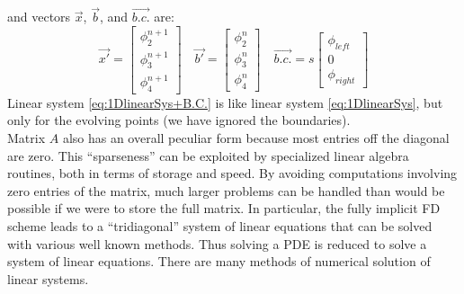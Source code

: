 and vectors $\vec{x}$, $\vec{b}$, and $\vec{b.c.}$ are:
\begin{equation}
\vec{x'}=\begin{bmatrix}
 \phi^{n+1}_{2} \\ \phi^{n+1}_{3} \\ \phi^{n+1}_{4}
\end{bmatrix}
\quad
\vec{b'}=\begin{bmatrix}
\phi^{n}_{2} \\ \phi^{n}_{3} \\ \phi^{n}_{4}
\end{bmatrix}
\quad
\vec{b.c.}=s \begin{bmatrix}
\phi_{left} \\ 0 \\ \phi_{right}
\end{bmatrix}
\end{equation}
Linear system \ref{eq:1DlinearSys+B.C.} is like linear system \ref{eq:1DlinearSys}, but only for the evolving points (we have ignored the boundaries).
\\
Matrix $A$ also has an overall peculiar form because most entries off the diagonal are zero. This “sparseness” can be exploited by specialized linear algebra routines, both in terms of storage and speed. By avoiding computations involving zero entries of the matrix, much larger problems can be handled than would be possible if we were to store the full matrix. In particular, the fully implicit FD scheme leads to a “tridiagonal” system of linear equations that can be solved with various well known methods.
Thus solving a PDE is reduced to solve a system of linear equations. There are many methods of numerical solution of linear systems. 
